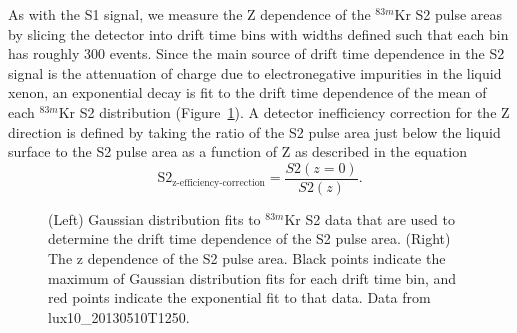 As with the S1 signal, we measure the Z dependence of the $^{83m}$Kr S2 pulse areas by slicing the detector into drift time bins with widths defined such that each bin has roughly 300 events.  Since the main source of drift time dependence in the S2 signal is the attenuation of charge due to electronegative impurities in the liquid xenon, an exponential decay is fit to the drift time dependence of the mean of each $^{83m}$Kr S2 distribution (Figure~\ref{fig:KrypCal_S2ZDep}).  A detector inefficiency correction for the Z direction is defined by taking the ratio of the S2  pulse area just below the liquid surface to the S2 pulse area as a function of Z as described in the equation
\begin{equation}
\mbox{S}2_{\mbox{z-efficiency-correction}} = \frac{S2(z=0)}{S2(z)}.
\end{equation} 

\begin{figure} 
\centering
{}
\qquad
{}
\caption{ (Left) Gaussian distribution fits to $^{83m}$Kr S2 data that are used to determine the drift time dependence of the S2 pulse area. (Right) The z dependence of the S2 pulse area. Black points indicate the maximum of Gaussian distribution fits for each drift time bin, and red points indicate the exponential fit to that data. Data from lux10\_20130510T1250.}
\label{fig:KrypCal_S2ZDep}
\end{figure}


